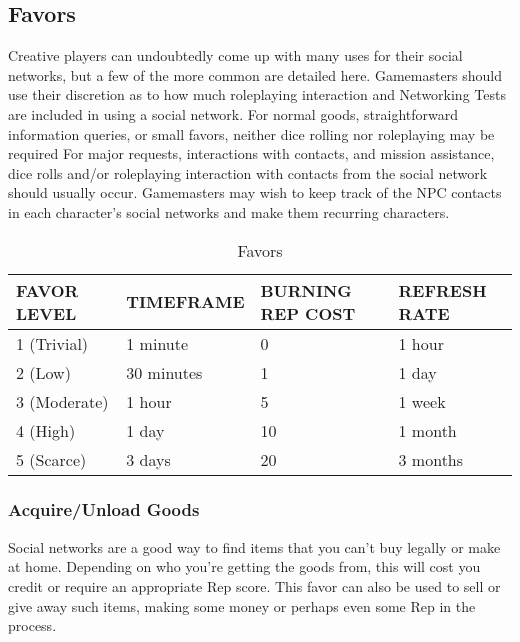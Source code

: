 \subsection{Favors} 

Creative players can undoubtedly come up with many uses for their social networks, but a few of the more common are detailed here. Gamemasters should use their discretion as to how much roleplaying interaction and Networking Tests are included in using a social network. For normal goods, straightforward information queries, or small favors, neither dice rolling nor roleplaying may be required For major requests, interactions with contacts, and mission assistance, dice rolls and/or roleplaying interaction with contacts from the social network should usually occur. Gamemasters may wish to keep track of the NPC contacts in each character's social networks and make them recurring characters. 

\begin{table} \caption{Favors} \begin{tabular}{|l|l|l|l|} \hline

FAVOR LEVEL &TIMEFRAME &BURNING REP COST &REFRESH RATE \\ \hline

1 (Trivial) &1 minute &0 &1 hour \\ \hline

2 (Low) &30 minutes &1 &1 day \\ \hline

3 (Moderate) &1 hour &5 &1 week \\ \hline

4 (High) &1 day &10 &1 month \\ \hline

5 (Scarce) &3 days &20 &3 months \\ \hline

\end{tabular} \end{table} 



\subsubsection{Acquire/Unload Goods} 

Social networks are a good way to find items that you can't buy legally or make at home. Depending on who you're getting the goods from, this will cost you credit or require an appropriate Rep score. This favor can also be used to sell or give away such items, making some money or perhaps even some Rep in the process. 

